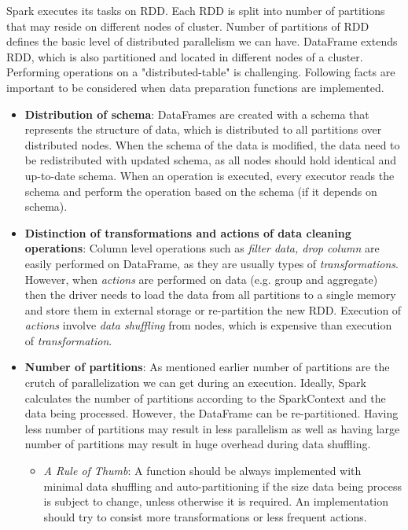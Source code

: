  Spark executes its tasks on RDD. Each RDD is split into number of partitions that may reside on different nodes of cluster. Number of partitions of RDD defines the basic level of distributed parallelism we can have. DataFrame extends RDD, which is also partitioned and located in different nodes of a cluster. Performing operations on a "distributed-table" is challenging. Following facts are important to be considered when data preparation functions are implemented.
\begin{itemize}
\item \textbf{Distribution of schema}: DataFrames are created with a schema that represents the structure of data, which is distributed to all partitions over distributed nodes. When the schema of the data is modified, the data need to be redistributed with updated schema, as all nodes should hold identical and up-to-date schema. When an operation is executed, every executor reads the schema and perform the operation based on the schema (if it depends on schema). 
\item \textbf{Distinction of transformations and actions of data cleaning operations}: Column level operations such as \textit{filter data, drop column} are easily performed on DataFrame, as they are usually types of \textit{transformations}. However, when \textit{actions} are performed on data (e.g. group and aggregate) then the driver needs to load the data from all partitions to a single memory and store them in external storage or re-partition the new RDD. Execution of \textit{actions} involve\textit{ data shuffling} from nodes, which is expensive than execution of \textit{transformation}. 
\item \textbf{Number of partitions}: As mentioned earlier number of partitions are the crutch of parallelization we can get during an execution. Ideally, Spark calculates the number of partitions according to the SparkContext and the data being processed. However, the DataFrame can be re-partitioned.  Having less number of partitions may result in less parallelism as well as having large number of partitions may result in huge overhead during data shuffling. 
\begin{itemize}
\item \textit{A Rule of Thumb}: A function should be always implemented with minimal data shuffling and auto-partitioning if the size data being process is subject to change, unless otherwise it is required. An implementation should try to consist more transformations or less frequent actions. 
\end{itemize}

\end{itemize}
